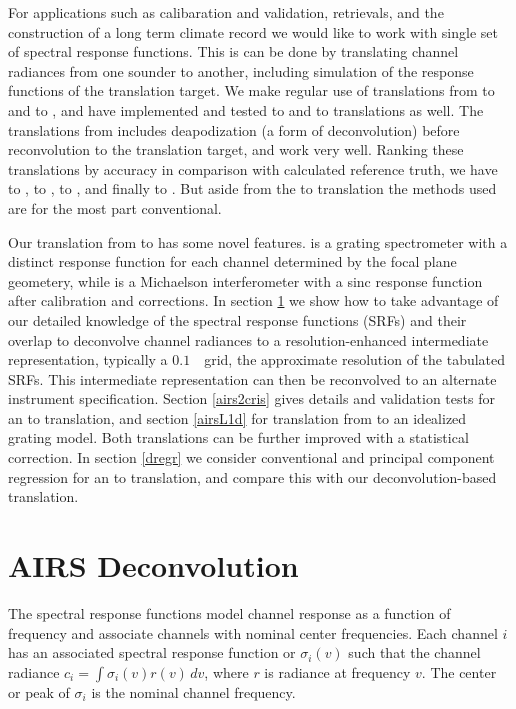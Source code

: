 \documentclass[10pt,twocolumn]{article}
\begin{document}
For applications such as calibaration and validation, retrievals,
and the construction of a long term climate record we would like 
to work with single set of spectral response functions.  This is
can be done by translating channel radiances from one sounder to
another, including simulation of the response functions of the
translation target.  We make regular use of translations from
{\airs} to {\cris} and {\iasi} to {\cris}, and have implemented and
tested {\iasi} to {\airs} and {\cris} to {\airs} translations as
well.  The translations from {\iasi} includes deapodization (a form
of deconvolution) before reconvolution to the translation target,
and work very well.  Ranking these translations by accuracy in
comparison with calculated reference truth, we have {\iasi} to
{\cris}, {\iasi} to {\airs}, {\airs} to {\cris}, and finally {\cris}
to {\airs} \cite{git:decon}.  But aside from the {\airs} to {\cris}
translation the methods used are for the most part conventional.

Our translation from {\airs} to {\cris} has some novel features.
{\airs} is a grating spectrometer with a distinct response function
for each channel determined by the focal plane geometery, while
{\cris} is a Michaelson interferometer with a sinc response function
after calibration and corrections.  In section \ref{decon} we show
how to take advantage of our detailed knowledge of the {\airs}
spectral response functions (SRFs) and their overlap to deconvolve
channel radiances to a resolution-enhanced intermediate
representation, typically a $0.1$~\wn\ grid, the approximate
resolution of the tabulated {\airs} SRFs.  This intermediate
representation can then be reconvolved to an alternate instrument
specification.  Section \ref{airs2cris} gives details and validation
tests for an {\airs} to {\cris} translation, and section
\ref{airsL1d} for translation from {\airs} to an idealized grating
model.  Both translations can be further improved with a statistical
correction.  In section \ref{dregr} we consider conventional and
principal component regression for an {\airs} to {\cris}
translation, and compare this with our deconvolution-based
translation.

\section{AIRS Deconvolution}
\label{decon}

The {\airs} spectral response functions model channel response as a
function of frequency and associate channels with nominal center
frequencies.  Each {\airs} channel $i$ has an associated spectral
response function or {\srf} $\sigma_i(v)$ such that the channel
radiance $c_i = \int \sigma_i(v)r(v)\,dv$, where $r$ is radiance at
frequency $v$.  The center or peak of $\sigma_i$ is the nominal
channel frequency.
\end{document}

